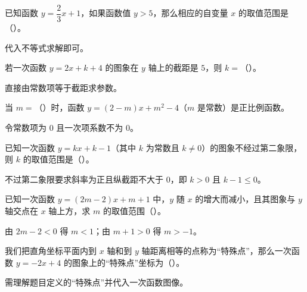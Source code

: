 \documentclass{exam-zh}
\begin{document}
\begin{question}[points=4]
  已知函数 $y=\dfrac23x+1$，如果函数值 $y>5$，那么相应的自变量 $x$ 的取值范围是（\qquad）。
  \paren[$x>6$]
  \begin{solutionblock}
    代入不等式求解即可。
  \end{solutionblock}
\end{question}



\begin{question}[points=4]
  若一次函数 $y=2x+k+4$ 的图象在 $y$ 轴上的截距是 $5$，则 $k=$（\qquad）。
  \paren[$1$]
  \begin{solutionblock}
    直接由常数项等于截距求参数。
  \end{solutionblock}
\end{question}



\begin{question}[points=4]
  当 $m=$（\qquad）时，函数 $y=(2-m)x+m^2-4$（$m$ 是常数）是正比例函数。
  \paren[$-2$]
  \begin{solutionblock}
    令常数项为 0 且一次项系数不为 0。
  \end{solutionblock}
\end{question}



\begin{question}[points=4]
  已知一次函数 $y=kx+k-1$（其中 $k$ 为常数且 $k\ne0$）的图象不经过第二象限，则 $k$ 的取值范围是（\qquad）。
  \paren[$0<k\le1$]
  \begin{solutionblock}
    不过第二象限要求斜率为正且纵截距不大于 $0$，即 $k>0$ 且 $k-1\le0$。
  \end{solutionblock}
\end{question}



\begin{question}[points=4]
  已知一次函数 $y=(2m-2)x+m+1$ 中，$y$ 随 $x$ 的增大而减小，且其图象与 $y$ 轴交点在 $x$ 轴上方，求 $m$ 的取值范围（\qquad）。
  \paren[$-1<m<1$]
  \begin{solutionblock}
    由 $2m-2<0$ 得 $m<1$；由 $m+1>0$ 得 $m>-1$。
  \end{solutionblock}
\end{question}



\begin{question}[points=4]
  我们把直角坐标平面内到 $x$ 轴和到 $y$ 轴距离相等的点称为“特殊点”，那么一次函数 $y=-2x+4$ 的图象上的“特殊点”坐标为（\qquad）。
  \paren[$(1,2)$]
  \begin{solutionblock}
    需理解题目定义的“特殊点”并代入一次函数图像。
  \end{solutionblock}
\end{question}
\end{document}
